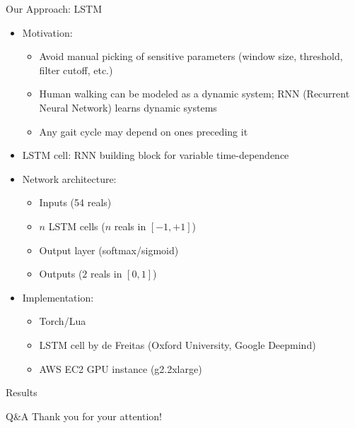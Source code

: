 \documentclass{beamer}
\begin{document}
\begin{frame}{Our Approach: LSTM}
    \begin{itemize}
        \item
            Motivation:
            \begin{itemize}
            \item
                Avoid manual picking of sensitive parameters (window size, threshold, filter cutoff, etc.)
            \item
                Human walking can be modeled as a dynamic system; RNN (Recurrent Neural Network) learns dynamic systems
            \item
                Any gait cycle may depend on ones preceding it
            \end{itemize}
        \item
            LSTM cell: RNN building block for variable time-dependence
        \item
            Network architecture:
            \begin{itemize}
                \item Inputs (54 reals)
                \item $n$ LSTM cells ($n$ reals in $[-1, +1]$)
                \item Output layer (softmax/sigmoid)
                \item Outputs ($2$ reals in $[0, 1]$)
            \end{itemize}
        \item
            Implementation:
            \begin{itemize}
                \item
                    Torch/Lua
                \item
                    LSTM cell by
                    de Freitas (Oxford University, Google Deepmind)
                \item
                    AWS EC2 GPU instance (g2.2xlarge)
            \end{itemize}
    \end{itemize}
\end{frame}

\begin{frame}{Results}
\end{frame}

\begin{frame}{Q\&A}
    \Large
    \centering
    Thank you for your attention!
\end{frame}
\end{document}
